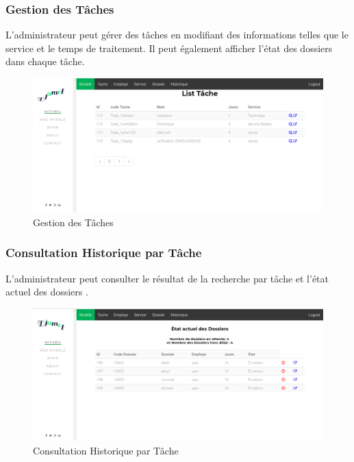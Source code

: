  
 
 
 \subsubsection{Gestion des Tâches }
L'administrateur peut gérer des tâches en modifiant des informations telles que le service et le temps de traitement. Il peut également afficher l'état des dossiers dans chaque tâche. 
\begin{figure}[H]
	\centering
	\includegraphics[width=1\linewidth]{images/captures/capturesadmin/tache}
	\caption{Gestion des Tâches}
	\label{fig:tache}
\end{figure}

\subsubsection{ Consultation Historique par Tâche }
L'administrateur peut consulter le résultat de la recherche par tâche et l'état actuel des dossiers .
\begin{figure}[H]
	\centering
	\includegraphics[width=1\linewidth]{images/captures/capturesadmin/HTache}
	\caption{Consultation Historique par Tâche}
	\label{fig:htache}
\end{figure}


